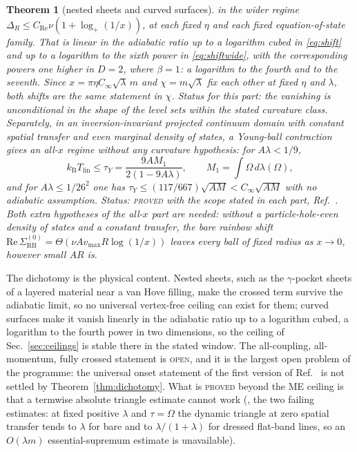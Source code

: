 \documentclass[aps,10pt,superscriptaddress,floatfix,amsmath,amssymb,nofootinbib]{revtex4-2}
\newcommand{\kb}{k_{\mathrm B}}
\newcommand{\Tlin}{T_{\mathrm{lin}}}
\newcommand{\Cinf}{C_\infty}
\newcommand{\PROVED}{\textsc{proved}}
\newcommand{\OPEN}{\textsc{open}}
\newtheorem{theorem}{Theorem}
\begin{document}
\begin{theorem}[nested sheets and curved surfaces]
in the wider regime $\Delta_R\le C_{\mathrm{Re}}\nu(1+\log_+(1/x))$, at each fixed $\eta$ and
each fixed equation-of-state family. That is linear in the adiabatic ratio up to a
logarithm cubed in \eqref{eq:shift} and up to a logarithm to the sixth power in
\eqref{eq:shiftwide}, with the corresponding powers one higher in $D=2$, where $\beta=1$:
a logarithm to the fourth and to the seventh. Since $x=\pi\eta\Cinf\sqrt\lambda\,m$ and
$\chi=m\sqrt\lambda$ fix each other at fixed $\eta$ and $\lambda$, both shifts are the same
statement in $\chi$.
Status for this part: the vanishing is unconditional in the shape of the level sets within
the stated curvature class. Separately, in an inversion-invariant projected continuum domain with constant
spatial transfer and even marginal density of states, a Young-ball contraction gives an
all-$x$ regime without any curvature hypothesis: for $A\lambda<1/9$,
\begin{equation}\label{eq:young}
\kb\Tlin\le\tau_Y=\frac{9AM_1}{2(1-9A\lambda)},\qquad M_1=\int\Omega\,d\lambda(\Omega),
\end{equation}
and for $A\lambda\le1/26^{2}$ one has $\tau_Y\le(117/667)\sqrt{AM}<\Cinf\sqrt{AM}$ with no
adiabatic assumption.
Status: \PROVED{} with the scope stated in each part, Ref.~\cite{msvertex}. Both extra
hypotheses of the all-$x$ part are needed: without a particle-hole-even density of states
and a constant transfer, the bare rainbow shift
$\mathrm{Re}\,\Sigma^{(0)}_{\mathrm{RB}}=\Theta(\nu A v_{\max}R\log(1/x))$ leaves every ball
of fixed radius as $x\to0$, however small $AR$ is.
\end{theorem}

The dichotomy is the physical content. Nested sheets, such as the $\gamma$-pocket sheets of
a layered material near a van Hove filling, make the crossed term survive the adiabatic
limit, so no universal vertex-free ceiling can exist for them; curved surfaces make it
vanish linearly in the adiabatic ratio up to a logarithm cubed, a logarithm to the fourth
power in two dimensions, so the ceiling
of Sec.~\ref{sec:ceilings} is stable there in the stated window. The all-coupling,
all-momentum, fully crossed statement is \OPEN{}, and it is the largest open problem of the
programme: the universal onset statement of the first version of Ref.~\cite{msvertex} is not
settled by Theorem~\ref{thm:dichotomy}. What is \PROVED{} beyond the ME ceiling is that a
termwise absolute triangle estimate cannot work (\cite{msvertex}, the two failing estimates:
at fixed positive $\lambda$ and $\tau=\Omega$ the dynamic triangle at zero spatial transfer
tends to $\lambda$ for bare and to $\lambda/(1+\lambda)$ for dressed flat-band lines, so an
$O(\lambda m)$ essential-supremum estimate is unavailable).
\end{document}
